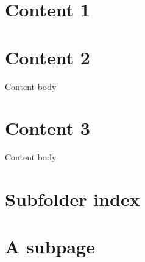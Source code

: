 

\pagestyle{empty}
\sphinxmaketitle
\pagestyle{plain}
\sphinxtableofcontents
\pagestyle{normal}
\label{\detokenize{index::doc}}


\sphinxAtStartPar
{}


\chapter{Content 1}
\label{\detokenize{content1:content-1}}\label{\detokenize{content1::doc}}

\chapter{Content 2}
\label{\detokenize{content2:content-2}}\label{\detokenize{content2::doc}}
\sphinxAtStartPar
Content body


\chapter{Content 3}
\label{\detokenize{content3:content-3}}\label{\detokenize{content3::doc}}
\sphinxAtStartPar
Content body


\chapter{Subfolder index}
\label{\detokenize{subfolder/index:subfolder-index}}\label{\detokenize{subfolder/index::doc}}
\sphinxAtStartPar
{}


\chapter{A subpage}
\label{\detokenize{subfolder/asubpage:a-subpage}}\label{\detokenize{subfolder/asubpage::doc}}






\renewcommand{\indexname}{Index}
\printindex
